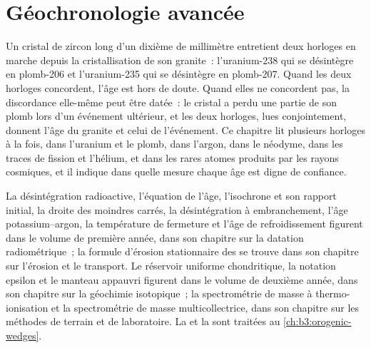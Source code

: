 \chapter{Géochronologie avancée}\label{ch:b3:advanced-geochronology}

Un cristal de zircon long d'un dixième de millimètre entretient deux horloges en marche
depuis la cristallisation de son granite~: l'uranium-238 qui se désintègre en plomb-206 et
l'uranium-235 qui se désintègre en plomb-207. Quand les deux horloges concordent, l'âge
est hors de doute. Quand elles ne concordent pas, la discordance elle-même peut être datée~: le
cristal a perdu une partie de son plomb lors d'un événement ultérieur, et les deux
horloges, lues conjointement, donnent l'âge du granite et celui de l'événement. Ce chapitre
lit plusieurs horloges à la fois, dans l'uranium et le plomb, dans l'argon, dans le
néodyme, dans les traces de fission et l'hélium, et dans les rares atomes produits par
les rayons cosmiques, et il indique dans quelle mesure chaque âge est digne de confiance.

\begin{recall}
La désintégration radioactive, l'équation de l'âge, l'isochrone et son rapport initial, la
droite des moindres carrés, la désintégration à embranchement, l'âge potassium--argon,
la température de fermeture et l'âge de refroidissement figurent dans le volume de première
année, dans son chapitre sur la datation radiométrique~; la formule d'érosion stationnaire
des  se trouve dans son chapitre sur l'érosion et le transport. Le
réservoir uniforme chondritique, la notation epsilon et le manteau appauvri figurent dans le
volume de deuxième année, dans son chapitre sur la géochimie isotopique~; la spectrométrie
de masse à thermo-ionisation et la spectrométrie de masse multicollectrice, dans son chapitre sur les méthodes de terrain et de laboratoire. La
 et la  sont traitées au \cref{ch:b3:orogenic-wedges}.
\end{recall}

